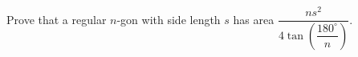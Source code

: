 Prove that a regular $n$-gon with side length $s$ has area $\dfrac{ns^2}{4\tan\left(\dfrac{180^\circ}n\right)}$.
